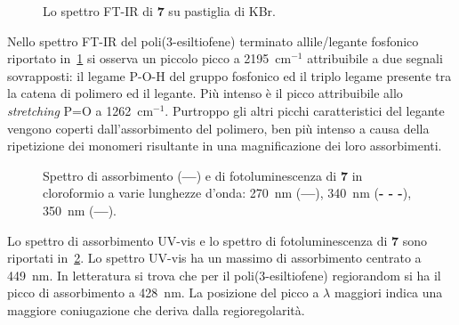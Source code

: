 \begin{figure}
\caption{\footnotesize{Lo spettro FT-IR di {\bf 7} su pastiglia di KBr.}
\label{fig:P3HT-leg-deprotetto-IR}}
\end{figure}
Nello spettro FT-IR del poli(3-esiltiofene) terminato allile/legante fosfonico  riportato in~\ref{fig:P3HT-leg-deprotetto-IR} si osserva un piccolo picco a 2195~cm$^{-1}$ attribuibile a {
due segnali sovrapposti: il legame P-O-H del gruppo fosfonico ed il triplo legame presente tra la catena di polimero ed il legante. Più intenso} è il picco attribuibile allo \emph{stretching} P=O a 1262~cm$^{-1}$. Purtroppo gli altri picchi caratteristici del legante vengono coperti dall'assorbimento del polimero, {
ben più intenso a causa della ripetizione dei monomeri risultante in una magnificazione dei loro assorbimenti.}
  


\begin{figure}
\caption{\footnotesize{Spettro di assorbimento ({\bf \large{---}}) e di fotoluminescenza di {\bf 7} in cloroformio a varie lunghezze d'onda: 270~nm ({\Large{{\bf{\color{cyan}---}}}}), 340~nm ({\bf \normalsize{- - -}}), 350~nm ({\Large{{\bf{\color{blue}---}}}}).}
\label{fig:P3HT-leg-deprotetto-UV-PL}}
\end{figure}
Lo spettro di assorbimento UV-vis e lo spettro di fotoluminescenza di {\bf 7} sono riportati in~\ref{fig:P3HT-leg-deprotetto-UV-PL}. Lo spettro UV-vis ha un massimo di assorbimento centrato a 449~nm. In letteratura \cite{pol-p3ht-regio} si trova che per il poli(3-esiltiofene) regiorandom si ha il picco di assorbimento a 428~nm. La posizione del picco a $\lambda$ maggiori indica una maggiore coniugazione che deriva dalla regioregolarità.

